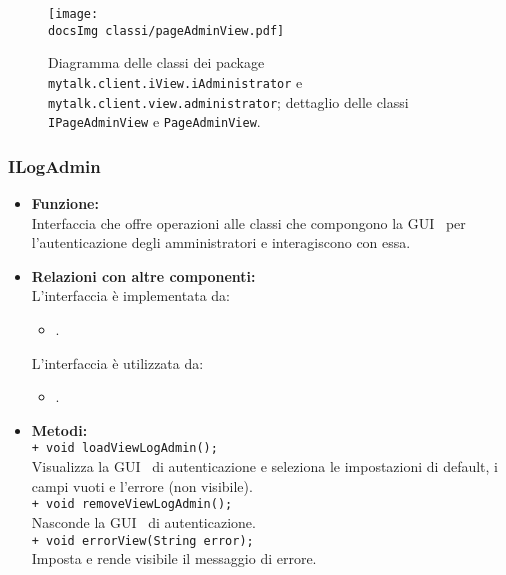 {\begin{sloppypar}
{{		\begin{figure}[h!tbp]
		\centering
		\texttt{[image: \\docsImg classi/pageAdminView.pdf]}
		\caption{Diagramma delle classi dei package \nolinkurl{mytalk.client.iView.iAdministrator} e  \nolinkurl{mytalk.client.view.administrator}; dettaglio delle classi \nolinkurl{IPageAdminView} e \nolinkurl{PageAdminView}.}
	\end{figure}	
	
	
		\subsubsection{ILogAdmin}\label{ssub:ILogAdmin}{
			\begin{itemize}
				\item[]  \textbf{Funzione:} \\
				Interfaccia che offre operazioni alle classi che compongono la GUI\g~ per l'autenticazione degli amministratori e interagiscono con essa.\\
				
				\item[]  \textbf{Relazioni con altre componenti:} \\
				L'interfaccia è implementata da:
				\begin{itemize}
					\item[] .
				\end{itemize}
				L'interfaccia è utilizzata da:
				\begin{itemize}
					\item[] .\\
				\end{itemize}
				
				\item[]  \textbf{Metodi:}\\
				\texttt{+ void loadViewLogAdmin();}\\
				Visualizza la GUI\g~ di autenticazione e seleziona le impostazioni di default\g, i campi vuoti e l'errore (non visibile).\\

				\texttt{+ void removeViewLogAdmin();}\\
				Nasconde la GUI\g~ di autenticazione.\\

				\texttt{+ void errorView(String error);}\\
				Imposta e rende visibile il messaggio di errore.\\
			\end{itemize}
			}
  
}}
\end{sloppypar}}
